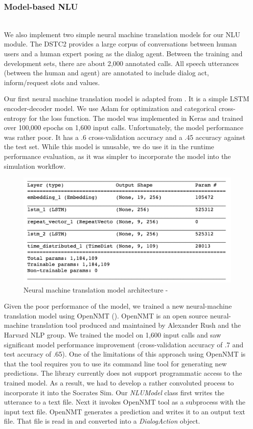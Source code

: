 \subsubsection{Model-based NLU}
~ \\
We also implement two simple neural machine translation models for our NLU module. The DSTC2 provides a large corpus of conversations between human users and a human expert posing as the dialog agent. Between the training and development sets, there are about 2,000 annotated calls. All speech utterances (between the human and agent) are annotated to include dialog act, inform/request slots and values.

Our first neural machine translation model is adapted from \cite{brownlee_2017}. It is a simple LSTM encoder-decoder model. We use Adam for optimization and categorical cross-entropy for the loss function. The model was implemented in Keras and trained over 100,000 epochs on 1,600 input calls. Unfortunately, the model performance was rather poor. It has a .6 cross-validation accuracy and a .45 accuracy against the test set. While this model is unusable, we do use it in the runtime performance evaluation, as it was simpler to incorporate the model into the simulation workflow. 

\begin{figure}[h!]
	\centering
	\includegraphics[scale=.25]{diagrams/simple_nmt.jpeg}
	\caption{ Neural machine translation model architecture  - \cite{brownlee_2017} }
	\label{fig:simple_nmt_model}
\end{figure}

Given the poor performance of the \cite{brownlee_2017} model, we trained a new neural-machine translation model using OpenNMT (\cite{2017opennmt}). OpenNMT is an open source neural-machine translation tool produced and maintained by Alexander Rush and the Harvard NLP group. We trained the model on 1,600 input calls and saw significant model performance improvement (cross-validation accuracy of .7 and test accuracy of .65). One of the limitations of this approach using OpenNMT is that the tool requires you to use its command line tool for generating new predictions. The library currently does not support programmatic access to the trained model. As a result, we had to develop a rather convoluted process to incorporate it into the Socrates Sim. Our \textit{NLUModel} class first writes the utterance to a text file. Next it invokes OpenNMT tool as a subprocess with the input text file. OpenNMT generates a prediction and writes it to an output text file. That file is read in and converted into a \textit{DialogAction} object. 

